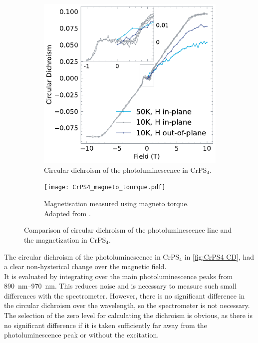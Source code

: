 \documentclass[
	twoside,
	parskip=half,
	a4paper,
]{scrbook}
\begin{document}
\begin{figure}
	\begin{subfigure}[t]{3.5in}
		\vskip 0pt
		\includegraphics{../figures/2023-12-14 CrPS4 circular dichroism.pdf}
		\caption{Circular dichroism of the photoluminescence in CrPS$_4$.}
		\label{fig:CrPS4 CD}
	\end{subfigure}
	\begin{subfigure}[t]{2.5in}
		\vskip 0pt
		\texttt{[image: CrPS4\_magneto\_tourque.pdf]}
		\caption{Magnetisation measured using magneto torque. Adapted from \cite[Figure 2]{CrPS4_magnetic}.}
		\label{fig:CrPS4 magnetic}
	\end{subfigure}
	\caption{Comparison of circular dichroism of the photoluminescence line and the magnetization in CrPS$_4$.}
\end{figure}
The circular dichroism of the photoluminescence in CrPS$_4$ in \autoref{fig:CrPS4 CD},
had a clear non-hysterical change over the magnetic field.\\
It is evaluated by integrating over the main photoluminescence peaks from \SIrange{890}{970}{nm}.
This reduces noise and is necessary to measure such small differences with the spectrometer.
However, there is no significant difference in the circular dichroism over the wavelength, so the spectrometer is not necessary.
The selection of the zero level for calculating the dichroism is obvious, as there is no significant difference if it is taken sufficiently far away from the photoluminescence peak or without the excitation.
\end{document}
